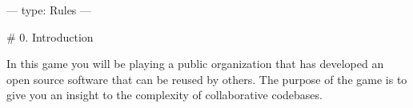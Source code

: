 ---
type: Rules
---

# 0. Introduction

In this game you will be playing a public organization that has developed an open source software that can be reused by others. The purpose of the game is to give you an insight to the complexity of collaborative codebases.
